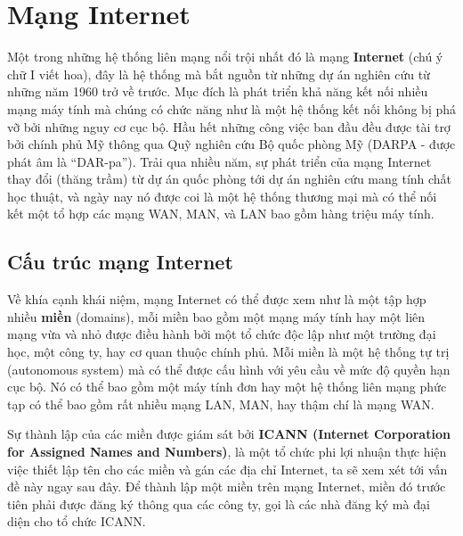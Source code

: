 
\section{Mạng Internet}
\label{sec:4.2}
Một trong những hệ thống liên mạng nổi trội nhất đó là mạng \textbf{Internet} (chú ý chữ I
viết hoa), đây là hệ thống mà bắt nguồn từ những dự án nghiên cứu từ những năm 1960 trở về
trước. Mục đích là phát triển khả năng kết nối nhiều mạng máy tính mà chúng có chức năng
như là một hệ thống kết nối không bị phá vỡ bởi những nguy cơ cục bộ. Hầu hết những công
việc ban đầu đều được tài trợ bởi chính phủ Mỹ thông qua Quỹ nghiên cứu Bộ quốc phòng Mỹ
(DARPA - được phát âm là ``DAR-pa''). Trải qua nhiều năm, sự phát triển của mạng Internet
thay đổi (thăng trầm) từ dự án quốc phòng tới dự án nghiên cứu mang tính chất học thuật,
và ngày nay nó được coi là một hệ thống thương mại mà có thể nối kết một tổ hợp các mạng
WAN, MAN, và LAN bao gồm hàng triệu máy tính.

\subsection*{Cấu trúc mạng Internet}
Về khía cạnh khái niệm, mạng Internet có thể được xem như là một tập hợp nhiều
\textbf{miền} (domains), mỗi miền bao gồm một mạng máy tính hay một liên mạng vừa và nhỏ được
điều hành bởi một tổ chức độc lập như một trường đại học, một công ty, hay cơ quan thuộc
chính phủ. Mỗi miền là một hệ thống tự trị (autonomous system) mà có thể được cấu hình với
yêu cầu về mức độ quyền hạn cục bộ. Nó có thể bao gồm một máy tính đơn hay một hệ thống
liên mạng phức tạp có thể bao gồm rất nhiều mạng LAN, MAN, hay thậm chí là mạng WAN.

Sự thành lập của các miền được giám sát bởi \textbf{ICANN (Internet Corporation for
  Assigned Names and Numbers)}, là một tổ chức phi lợi nhuận thực hiện việc thiết lập tên
cho các miền và gán các địa chỉ Internet, ta sẽ xem xét tới vấn đề này ngay sau
đây. Để thành lập một miền trên mạng Internet, miền đó trước tiên phải được đăng ký thông
qua các công ty, gọi là các nhà đăng ký mà đại diện cho tổ chức ICANN.


